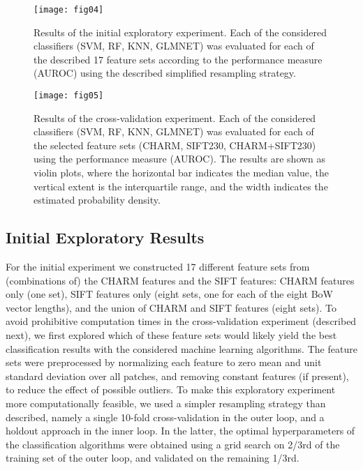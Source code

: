 \begin{figure}[!t]
\centering
\texttt{[image: fig04]}
\caption{Results of the initial exploratory experiment. Each of the considered classifiers (SVM, RF, KNN, GLMNET) was evaluated for each of the {\color{red}described} 17 feature sets according to the performance measure (AUROC) using the described simplified resampling strategy.}
\label{fig:initialResults}
\end{figure}

\begin{figure}[!b]
\centering
\texttt{[image: fig05]}
\caption{Results of the cross-validation experiment. Each of the considered classifiers (SVM, RF, KNN, GLMNET) was evaluated for each of the selected feature sets (CHARM, SIFT230, CHARM+SIFT230) using the performance measure (AUROC). The results are shown as violin plots, where the horizontal bar indicates the median value, the vertical extent is the interquartile range, and the width indicates the estimated probability density.}
\label{fig:fullCVresults}
\end{figure}

\subsection{Initial Exploratory Results}
\label{subsec:initialExploratoryExperiments}

For the initial experiment we constructed 17 different feature sets from (combinations of) the CHARM features and the SIFT features{\color{red}: CHARM features only (one set), SIFT features only (eight sets, one for each of the eight BoW vector lengths), and the union of CHARM and SIFT features (eight sets).} To avoid prohibitive computation times in the cross-validation experiment (described next), we first explored which of these feature sets would likely yield the best classification results with the considered machine learning algorithms. The feature sets were preprocessed by normalizing each feature to zero mean and unit standard deviation over all patches, and removing constant features (if present), to reduce the effect of possible outliers. To make this exploratory experiment more computationally feasible, we used a simpler resampling strategy than described, namely a single 10-fold cross-validation in the outer loop, and a holdout approach in the inner loop. In the latter, the optimal hyperparameters of the classification algorithms were obtained using a grid search on 2/3rd of the training set of the outer loop, and validated on the remaining 1/3rd.

